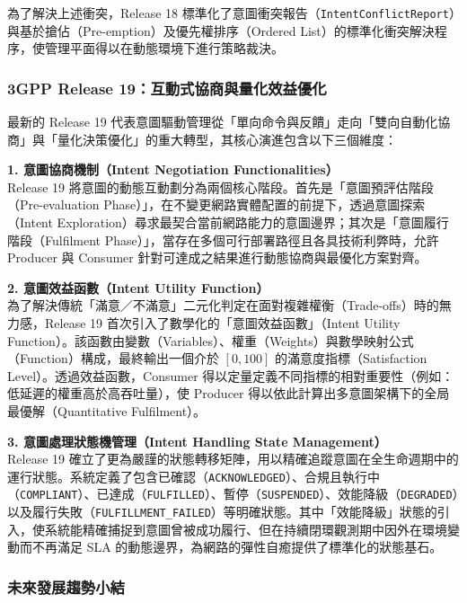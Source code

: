 為了解決上述衝突，Release 18 標準化了意圖衝突報告（\texttt{IntentConflictReport}）與基於搶佔（Pre-emption）及優先權排序（Ordered List）的標準化衝突解決程序，使管理平面得以在動態環境下進行策略裁決。

\subsubsection{3GPP Release 19：互動式協商與量化效益優化}

最新的 Release 19 代表意圖驅動管理從「單向命令與反饋」走向「雙向自動化協商」與「量化決策優化」的重大轉型，其核心演進包含以下三個維度：

\textbf{1. 意圖協商機制（Intent Negotiation Functionalities）} \\
Release 19 將意圖的動態互動劃分為兩個核心階段。首先是「意圖預評估階段（Pre-evaluation Phase）」，在不變更網路實體配置的前提下，透過意圖探索（Intent Exploration）尋求最契合當前網路能力的意圖邊界；其次是「意圖履行階段（Fulfilment Phase）」，當存在多個可行部署路徑且各具技術利弊時，允許 Producer 與 Consumer 針對可達成之結果進行動態協商與最優化方案對齊。

\textbf{2. 意圖效益函數（Intent Utility Function）} \\
為了解決傳統「滿意／不滿意」二元化判定在面對複雜權衡（Trade-offs）時的無力感，Release 19 首次引入了數學化的「意圖效益函數」（Intent Utility Function）。該函數由變數（Variables）、權重（Weights）與數學映射公式（Function）構成，最終輸出一個介於 $[0, 100]$ 的滿意度指標（Satisfaction Level）。透過效益函數，Consumer 得以定量定義不同指標的相對重要性（例如：低延遲的權重高於高吞吐量），使 Producer 得以依此計算出多意圖架構下的全局最優解（Quantitative Fulfilment）。

\textbf{3. 意圖處理狀態機管理（Intent Handling State Management）} \\
Release 19 確立了更為嚴謹的狀態轉移矩陣，用以精確追蹤意圖在全生命週期中的運行狀態。系統定義了包含已確認（\texttt{ACKNOWLEDGED}）、合規且執行中（\texttt{COMPLIANT}）、已達成（\texttt{FULFILLED}）、暫停（\texttt{SUSPENDED}）、效能降級（\texttt{DEGRADED}）以及履行失敗（\texttt{FULFILLMENT\_FAILED}）等明確狀態。其中「效能降級」狀態的引入，使系統能精確捕捉到意圖曾被成功履行、但在持續閉環觀測期中因外在環境變動而不再滿足 SLA 的動態邊界，為網路的彈性自癒提供了標準化的狀態基石。

\subsubsection{未來發展趨勢小結}

